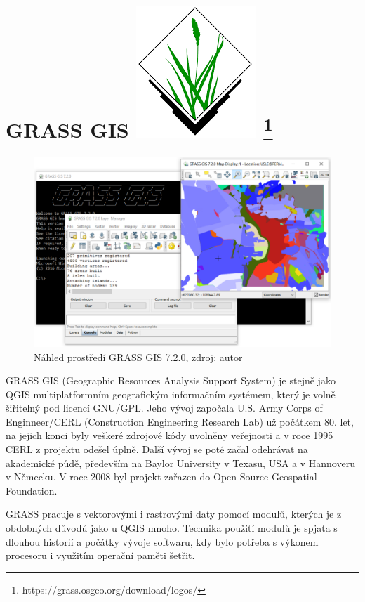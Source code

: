 \section[GRASS GIS]{GRASS GIS \includegraphics[scale=0.12]
{./pictures/grass.png} \footnote{https://grass.osgeo.org/download/logos/}}
\label{grassgis}
\begin{figure}[H]
    \centering \includegraphics[scale=0.6]{./pictures/grass_screen.png}
      \caption[Náhled prostředí GRASS GIS 7.2.0]
      {Náhled prostředí GRASS GIS 7.2.0, zdroj: autor}
      \label{screen:grass}
\end{figure}
GRASS GIS (Geographic Resources Analysis Support System) je stejně
jako QGIS multiplatformním geografickým informačním systémem, který je
volně šiřitelný pod licencí GNU/GPL. Jeho vývoj započala U.S. Army
Corps of Enginneer/CERL (Construction Engineering Research Lab) už
počátkem 80. let, na jejich konci byly veškeré zdrojové kódy uvolněny
veřejnosti a v roce 1995 CERL z projektu odešel úplně. Další vývoj se
poté začal odehrávat na akademické půdě, především na Baylor
University v Texasu, USA a v Hannoveru v Německu. V roce 2008 byl
projekt zařazen do Open Source Geospatial Foundation.

GRASS pracuje s vektorovými i rastrovými daty pomocí modulů, kterých
je z obdobných důvodů jako u QGIS mnoho. Technika použití modulů je
spjata s dlouhou historií a počátky vývoje softwaru, kdy bylo potřeba
s výkonem procesoru i využitím operační paměti šetřit.

